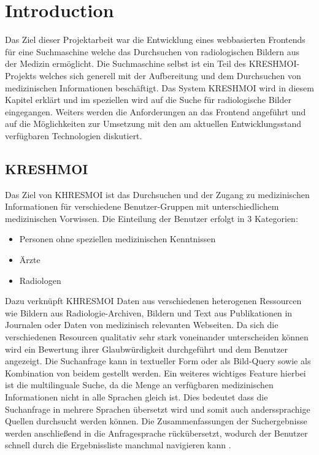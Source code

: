 
\section{Introduction}
\label{sec:introduction}
Das Ziel dieser Projektarbeit war die Entwicklung eines webbasierten Frontends für eine Suchmaschine welche das Durchsuchen von radiologischen Bildern aus der Medizin ermöglicht.
Die Suchmaschine selbst ist ein Teil des KRESHMOI-Projekts \cite{kres} welches sich generell mit der Aufbereitung und dem Durchsuchen von medizinischen Informationen beschäftigt.
Das System KRESHMOI wird in diesem Kapitel erklärt und im speziellen wird auf die Suche für radiologische Bilder eingegangen.
Weiters werden die Anforderungen an das Frontend angeführt und auf die Möglichkeiten zur Umsetzung mit den am aktuellen Entwicklungsstand verfügbaren Technologien diskutiert.

\subsection{KRESHMOI}
\label{sec:Motivation}

Das Ziel von KHRESMOI ist das Durchsuchen und der Zugang zu medizinischen Informationen für verschiedene Benutzer-Gruppen mit unterschiedlichem medizinischen Vorwissen.
Die Einteilung der Benutzer erfolgt in 3 Kategorien:
\begin{itemize}
	\item Personen ohne speziellen medizinischen Kenntnissen
	\item Ärzte
	\item Radiologen
\end{itemize}
Dazu verknüpft KHRESMOI Daten aus verschiedenen heterogenen Ressourcen wie Bildern aus Radiologie-Archiven, Bildern und Text aus Publikationen in Journalen oder Daten von medizinisch relevanten Webseiten.
Da sich die verschiedenen Resourcen qualitativ sehr stark voneinander unterscheiden können wird ein Bewertung ihrer Glaubwürdigkeit durchgeführt und dem Benutzer angezeigt. 
%
Die Suchanfrage kann in textueller Form oder als Bild-Query sowie als Kombination von beidem gestellt werden.
Ein weiteres wichtiges Feature hierbei ist die multilinguale Suche, da die Menge an verfügbaren medizinischen Informationen nicht in alle Sprachen gleich ist.
Dies bedeutet dass die Suchanfrage in mehrere Sprachen übersetzt wird und somit auch anderssprachige Quellen durchsucht werden können.
Die Zusammenfassungen der Suchergebnisse werden anschließend in die Anfragesprache rückübersetzt, 
wodurch der Benutzer schnell durch die Ergebnissliste manchmal navigieren kann \cite{kres}.

